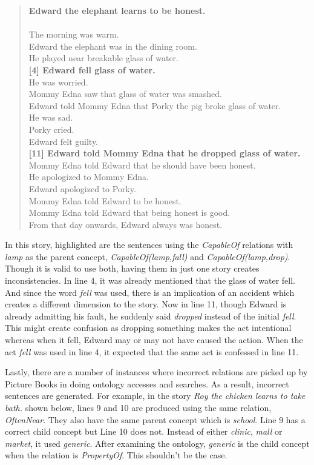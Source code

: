 \begin{verse}
\textbf{Edward the elephant learns to be honest.}\\
~\\
[1]  The morning was warm.\\
[2]  Edward the elephant was in the dining room.\\
[3]  He played near breakable glass of water.\\
\textbf{[4]  Edward fell glass of water.}\\
[5]  He was worried.\\
[6]  Mommy Edna saw that glass of water was smashed.\\
[7]  Edward told Mommy Edna that Porky the pig broke glass of water.\\
[8]  He was sad.\\
[9]  Porky cried.\\
[10] Edward felt guilty.\\
\textbf{[11] Edward told Mommy Edna that he dropped glass of water.}\\
[12] Mommy Edna told Edward that he should have been honest.\\
[13] He apologized to Mommy Edna.\\
[14] Edward apologized to Porky.\\
[15] Mommy Edna told Edward to be honest.\\
[16] Mommy Edna told Edward that being honest is good.\\
[17] From that day onwards, Edward always was honest.
\end{verse}

In this story, highlighted are the sentences using the \textit{CapableOf} relations with \textit{lamp} as the parent concept, \textit{CapableOf(lamp,fall)} and \textit{CapableOf(lamp,drop)}. Though it is valid to use both, having them in just one story creates inconsistencies. In line 4, it was already mentioned that the glass of water fell. And since the word \textit{fell} was used, there is an implication of an accident which creates a different dimension to the story. Now in line 11, though Edward is already admitting his fault, he suddenly said \textit{dropped} instead of the initial \textit{fell}. This might create confusion as dropping something makes the act intentional whereas when it fell, Edward may or may not have caused the action. When the act \textit{fell} was used in line 4, it expected that the same act is confessed in line 11.

Lastly, there are a number of instances where incorrect relations are picked up by Picture Books in doing ontology accesses and searches. As a result, incorrect sentences are generated. For example, in the story \textit{Roy the chicken learns to take bath.} shown below, lines 9 and 10 are produced using the same relation, \textit{OftenNear}. They also have the same parent concept which is \textit{school}. Line 9 has a correct child concept but Line 10 does not. Instead of either \textit{clinic}, \textit{mall} or \textit{market}, it used \textit{generic}. After examining the ontology, \textit{generic} is the child concept when the relation is \textit{PropertyOf}. This shouldn't be the case. 

